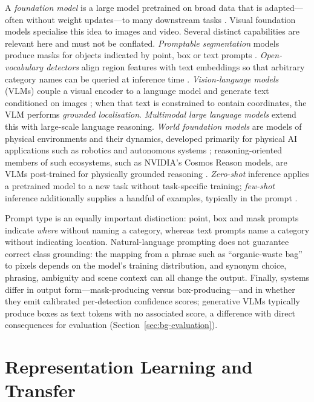 A \emph{foundation model} is a large model pretrained on broad data that is adapted---often without weight updates---to many downstream tasks \citep{bommasani2021opportunities}. Visual foundation models specialise this idea to images and video. Several distinct capabilities are relevant here and must not be conflated. \emph{Promptable segmentation} models produce masks for objects indicated by point, box or text prompts \citep{kirillov2023segment}. \emph{Open-vocabulary detectors} align region features with text embeddings so that arbitrary category names can be queried at inference time \citep{zareian2021open,li2022grounded}. \emph{Vision-language models} (VLMs) couple a visual encoder to a language model and generate text conditioned on images \citep{radford2021learning,bai2025qwen25vl}; when that text is constrained to contain coordinates, the VLM performs \emph{grounded localisation}. \emph{Multimodal large language models} extend this with large-scale language reasoning. \emph{World foundation models} are models of physical environments and their dynamics, developed primarily for physical AI applications such as robotics and autonomous systems \citep{ha2018world,nvidia2025cosmosplatform}; reasoning-oriented members of such ecosystems, such as NVIDIA's Cosmos Reason models, are VLMs post-trained for physically grounded reasoning \citep{nvidia2025cosmosreason1}. \emph{Zero-shot} inference applies a pretrained model to a new task without task-specific training; \emph{few-shot} inference additionally supplies a handful of examples, typically in the prompt \citep{brown2020language}.

Prompt type is an equally important distinction: point, box and mask prompts indicate \emph{where} without naming a category, whereas text prompts name a category without indicating location. Natural-language prompting does not guarantee correct class grounding: the mapping from a phrase such as ``organic-waste bag'' to pixels depends on the model's training distribution, and synonym choice, phrasing, ambiguity and scene context can all change the output. Finally, systems differ in output form---mask-producing versus box-producing---and in whether they emit calibrated per-detection confidence scores; generative VLMs typically produce boxes as text tokens with no associated score, a difference with direct consequences for evaluation (Section~\ref{sec:bg-evaluation}).

\section{Representation Learning and Transfer}
\label{sec:bg-representation}

